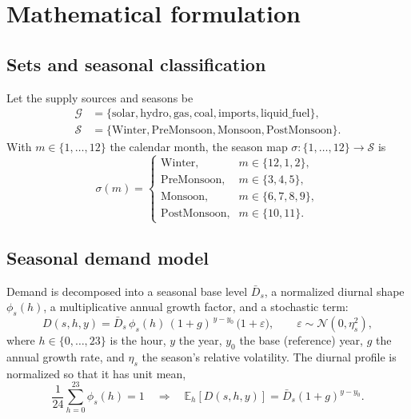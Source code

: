 \documentclass[11pt]{article}
\newcommand{\seasonset}{\mathcal{S}}
\newcommand{\srcset}{\mathcal{G}}
\begin{document}
\section{Mathematical formulation}

\subsection{Sets and seasonal classification}
Let the supply sources and seasons be
\begin{align*}
\srcset&=\{\text{solar},\text{hydro},\text{gas},\text{coal},
\text{imports},\text{liquid\_fuel}\},\\
\seasonset&=\{\text{Winter},\text{PreMonsoon},\text{Monsoon},
\text{PostMonsoon}\}.
\end{align*}
With $m\in\{1,\dots,12\}$ the calendar month, the season map
$\sigma:\{1,\dots,12\}\to\seasonset$ is
\begin{equation}
\sigma(m)=
\begin{cases}
\text{Winter}, & m\in\{12,1,2\},\\
\text{PreMonsoon}, & m\in\{3,4,5\},\\
\text{Monsoon}, & m\in\{6,7,8,9\},\\
\text{PostMonsoon}, & m\in\{10,11\}.
\end{cases}
\end{equation}

\subsection{Seasonal demand model}
Demand is decomposed into a seasonal base level $\bar{D}_s$, a normalized
diurnal shape $\phi_s(h)$, a multiplicative annual growth factor, and a
stochastic term:
\begin{equation}
D(s,h,y)=\bar{D}_s\,\phi_s(h)\,(1+g)^{\,y-y_0}\,\bigl(1+\varepsilon\bigr),
\qquad \varepsilon\sim\mathcal{N}\!\left(0,\eta_s^2\right),
\label{eq:demand}
\end{equation}
where $h\in\{0,\dots,23\}$ is the hour, $y$ the year, $y_0$ the base
(reference) year, $g$ the annual growth rate, and $\eta_s$ the season's relative
volatility. The diurnal profile is normalized so that it has unit mean,
\begin{equation}
\frac{1}{24}\sum_{h=0}^{23}\phi_s(h)=1
\quad\Longrightarrow\quad
\mathbb{E}_h\!\left[D(s,h,y)\right]=\bar{D}_s(1+g)^{y-y_0}.
\end{equation}
\end{document}
